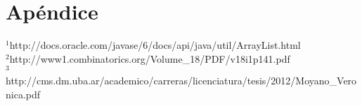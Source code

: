 \section{Apéndice}

$ ^{1}$http://docs.oracle.com/javase/6/docs/api/java/util/ArrayList.html\\
$ ^{2}$http://www1.combinatorics.org/Volume\_18/PDF/v18i1p141.pdf\\
$ ^{3}$http://cms.dm.uba.ar/academico/carreras/licenciatura/tesis/2012/Moyano\_Veronica.pdf\\
